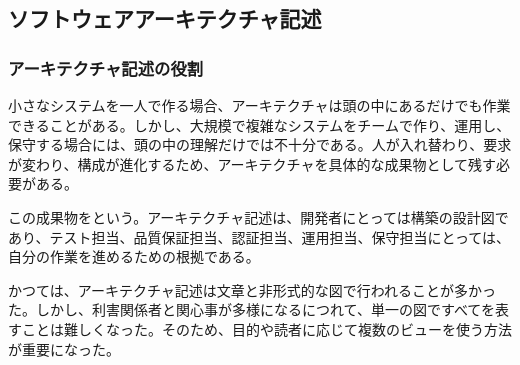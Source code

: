 \subsection{ソフトウェアアーキテクチャ記述}

\subsubsection*{アーキテクチャ記述の役割}
小さなシステムを一人で作る場合、アーキテクチャは頭の中にあるだけでも作業できることがある。しかし、大規模で複雑なシステムをチームで作り、運用し、保守する場合には、頭の中の理解だけでは不十分である。人が入れ替わり、要求が変わり、構成が進化するため、アーキテクチャを具体的な成果物として残す必要がある。

この成果物をという。アーキテクチャ記述は、開発者にとっては構築の設計図であり、テスト担当、品質保証担当、認証担当、運用担当、保守担当にとっては、自分の作業を進めるための根拠である。

かつては、アーキテクチャ記述は文章と非形式的な図で行われることが多かった。しかし、利害関係者と関心事が多様になるにつれて、単一の図ですべてを表すことは難しくなった。そのため、目的や読者に応じて複数のビューを使う方法が重要になった。
